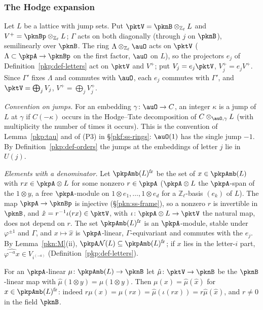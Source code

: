 \documentclass[10pt]{amsart}
\theoremstyle{definition}
\theoremstyle{remark}
\newcommand{\Z}{\mathbb Z}
\begin{document}
\subsubsection{The Hodge expansion}\label{pkt:ss-hodge}

Let $L$ be a lattice with jump sets. Put $\pktV=\pknB\otimes_{\Z_\ell}L$ and $V^+=\pknBp\otimes_{\Z_\ell}L$;
$\Gamma$ acts on both diagonally (through $j$ on $\pknB$), semilinearly over $\pknB$. The ring
$\Lambda\otimes_{\Z_\ell}\auO$ acts on $\pktV$ ($\Lambda\subset\pkpA\to\pknBp$ on the first factor, $\auO$ on
$L$), so the projectors $e_j$ of Definition~\ref{pkp:def-letters} act on $\pktV$ and $V^+$; put
$V_j=e_j\pktV$, $V_j^+=e_jV^+$. Since $\Gamma'$ fixes $\Lambda$ and commutes with $\auO$, each $e_j$ commutes
with $\Gamma'$, and $\pktV=\bigoplus_jV_j$, $V^+=\bigoplus_jV_j^+$.

\emph{Convention on jumps.} For an embedding $\gamma\colon\auO\to C$, an integer $\kappa$ is a jump of $L$
at $\gamma$ if $C(-\kappa)$ occurs in the Hodge--Tate decomposition of $C\otimes_{\auO,\gamma}L$ (with
multiplicity the number of times it occurs). This is the convention of Lemma~\ref{pkp:tau} and of
(P3) in \S\ref{pkf:ss-rings}: $\auO(1)$ has the single jump $-1$. By Definition~\ref{pkp:def-orders} the
jumps at the embeddings of letter $j$ lie in $U(j)$.

\emph{Elements with a denominator.} Let $\pkpAmb(L)^{\mathrm{fr}}$ be the set of $x\in\pkpAmb(L)$ with
$rx\in\pkpA\otimes L$ for some nonzero $r\in\pkpA$ ($\pkpA\otimes L$ the $\pkpA$-span of the $1\otimes y$,
a free $\pkpA$-module on $1\otimes e_1,\dots,1\otimes e_d$ for a $\Z_\ell$-basis $(e_k)$ of $L$). The map
$\pkpA\to\pknBp$ is injective (\S\ref{pkn:ss-frame}), so a nonzero $r$ is invertible in $\pknB$, and
$\hat x=r^{-1}\iota(rx)\in\pktV$, with $\iota\colon\pkpA\otimes L\to\pktV$ the natural map, does not
depend on $r$. The set $\pkpAmb(L)^{\mathrm{fr}}$ is an $\pkpA$-module, stable under $\varphi^{\pm1}$ and
$\Gamma$, and $x\mapsto\hat x$ is $\pkpA$-linear, $\Gamma$-equivariant and commutes with the $e_j$. By
Lemma~\ref{pkn:M}(ii), $\pkpA\mathcal N(L)\subseteq\pkpAmb(L)^{\mathrm{fr}}$; if $x$ lies in the letter-$i$
part, $\widehat{\varphi^{-a}x}\in V_{i^{(-a)}}$ (Definition~\ref{pkp:def-letters}).

For an $\pkpA$-linear $\mu\colon\pkpAmb(L)\to\pknB$ let $\hat\mu\colon\pktV\to\pknB$ be the $\pknB$-linear
map with $\hat\mu(1\otimes y)=\mu(1\otimes y)$. Then $\mu(x)=\hat\mu(\hat x)$ for
$x\in\pkpAmb(L)^{\mathrm{fr}}$: indeed $r\mu(x)=\mu(rx)=\hat\mu(\iota(rx))=r\hat\mu(\hat x)$, and $r\ne0$ in
the field $\pknB$.
\end{document}
